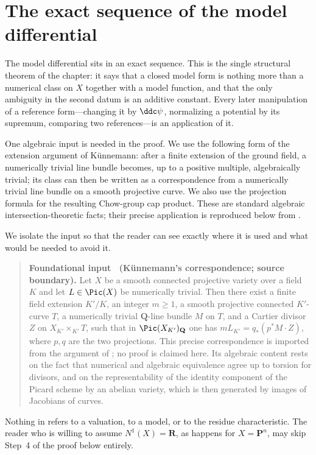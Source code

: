 \section{The exact sequence of the model differential}
\label{sec:ch20-exact}

The model differential sits in an exact sequence.  This is the single
structural theorem of the chapter: it says that a closed model form is
nothing more than a numerical class on \(X\) together with a model function,
and that the only ambiguity in the second datum is an additive constant.
Every later manipulation of a reference form---changing it by \(\ddc\psi\),
normalizing a potential by its supremum, comparing two references---is an
application of it.

One algebraic input is
needed in the proof.  We use the following form of the extension argument of
K\"unnemann: after a finite extension of the ground field, a numerically
trivial line bundle becomes, up to a positive multiple, algebraically
trivial; its class can then be written as a correspondence from a
numerically trivial line bundle on a smooth projective curve.  We also use
the projection formula for the resulting Chow-group cap product.  These are
standard algebraic intersection-theoretic facts; their precise application
is reproduced below from \cite[proof of Theorem~4.3]{BFJ16}.

We isolate the input so that the reader can see exactly where it is used and
what would be needed to avoid it.

\label{lem:ch20-kunnemann-input}
\begin{quote}
\textbf{Foundational input \thelemma\ (K\"unnemann's correspondence;
source boundary).}
Let \(X\) be a smooth connected projective variety over a field \(K\) and
let \(L\in\Pic(X)\) be numerically trivial.  Then there exist a finite field
extension \(K'/K\), an integer \(m\geq1\), a smooth projective connected
\(K'\)-curve \(T\), a numerically trivial \(\mathbf Q\)-line bundle \(M\) on
\(T\), and a Cartier divisor \(Z\) on \(X_{K'}\times_{K'}T\), such that in
\(\Pic(X_{K'})_{\mathbf Q}\) one has
\(mL_{K'}=q_*(p^*M\cdot Z)\), where \(p,q\) are the two projections.
This precise correspondence is imported from the argument of
\cite[proof of Theorem~4.3]{BFJ16}; no proof is claimed here.  Its
algebraic content rests on the fact that numerical and
algebraic equivalence agree up to torsion for divisors, and on the
representability of the identity component of the Picard scheme by an
abelian variety, which is then generated by images of Jacobians of curves.
\end{quote}
Nothing in  refers to a valuation, to a
model, or to the residue characteristic.  The reader who is willing to
assume \(N^1(X)=\mathbf R\), as happens for \(X=\mathbf P^n\), may skip
Step~4 of the proof below entirely.

